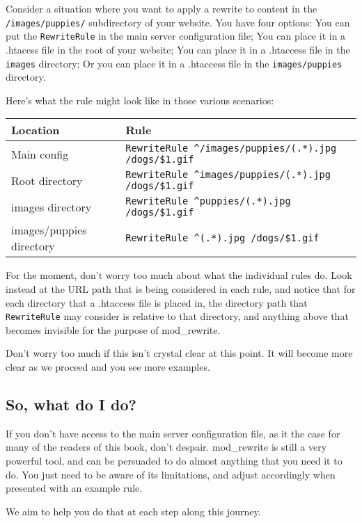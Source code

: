 Consider a situation where you want to apply a rewrite to content in the \verb~/images/puppies/~ subdirectory of your website. You have four options: You can put the \verb~RewriteRule~ in the main server configuration file; You can place it in a .htacess file in the root of your website; You can place it in a .htaccess file in the \verb~images~ directory; Or you can place it in a .htaccess file in the \verb~images/puppies~ directory.

Here's what the rule might look like in those various scenarios:

\begin{tabular}{|l|l|}
\hline \bf{Location} & \bf{Rule} \\ 
\hline Main config & \verb~RewriteRule ^/images/puppies/(.*).jpg /dogs/$1.gif~ \\
\hline Root directory &  \verb~RewriteRule ^images/puppies/(.*).jpg /dogs/$1.gif~ \\ 
\hline images directory &  \verb~RewriteRule ^puppies/(.*).jpg /dogs/$1.gif~ \\ 
\hline images/puppies directory &  \verb~RewriteRule ^(.*).jpg /dogs/$1.gif~ \\  
\hline 
\end{tabular} 

For the moment, don't worry too much about what the individual rules do.
Look instead at the URL path that is being considered in each rule, and
notice that for each directory that a .htaccess file is placed in, the directory path that \verb~RewriteRule~ may consider is relative to that directory, and anything above that becomes invisible for the purpose of mod\_rewrite.

Don't worry too much if this isn't crystal clear at this point. It will become more clear as we proceed and you see more examples.

\subsection{So, what do I do?}

If you don't have access to the main server configuration file, as it the case for many of the readers of this book, don't despair. mod\_rewrite is still a very powerful tool, and can be persuaded to do almost anything that you need it to do. You just need to be aware of its limitations, and adjust accordingly when presented with an example rule.

We aim to help you do that at each step along this journey.

